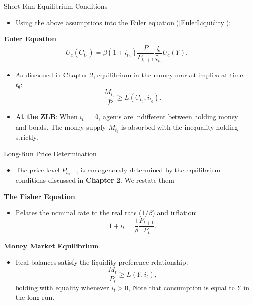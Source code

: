 \documentclass[11pt,aspectratio=169]{beamer}
\begin{document}
\begin{frame}{Short-Run Equilibrium Conditions}
\small

\begin{itemize}
    \item Using the above assumptions into the Euler equation (\ref{EulerLiquidity}):
\end{itemize}
\textbf{Euler Equation}
\begin{equation}
U_{c}(C_{t_{0}})=\beta (1+i_{t_{0}})\frac{\bar{P}}{P_{t_{0}+1}}\frac{\bar{\xi}}{\xi _{t_{0}}}U_{c}(Y). \label{Euler-L}
\end{equation}

\vspace{0.4cm}

\begin{itemize}
    \item As discussed in Chapter 2, equilibrium in the money market implies at time $t_0$:
\begin{equation*}
\frac{M_{t_{0}}}{\bar{P}}\geq L(C_{t_{0}},i_{t_{0}}).
\end{equation*}
    \item \textbf{At the ZLB}: When $i_{t_0} = 0$, agents are indifferent between holding money and bonds. The money supply $M_{t_0}$ is absorbed with the inequality holding strictly.
\end{itemize}

\end{frame}

\begin{frame}{Long-Run Price Determination }
\small
\begin{itemize}
    \item The price level $P_{t_0+1}$ is endogenously determined by the equilibrium conditions discussed in \textbf{Chapter 2}. We restate them:
\end{itemize}

\vspace{0.3cm}
\textbf{The Fisher Equation}
\begin{itemize}
    \item Relates the nominal rate to the real rate ($1/\beta$) and inflation:
    \begin{equation}
    1+i_{t}=\frac{1}{\beta }\frac{P_{t+1}}{P_{t}}  \label{Fisher-L}.
    \end{equation}
\end{itemize}

\vspace{0.2cm}
\textbf{Money Market Equilibrium}
\begin{itemize}
    \item Real balances satisfy the liquidity preference relationship:
    \begin{equation}
    \frac{M_{t}}{P_{t}}\geq L(Y,i_{t}), \label{Money-L}
    \end{equation}
    holding with equality whenever $i_{t}>0$, Note that consumption is equal to $Y$ in the long run.
\end{itemize}
\end{frame}
\end{document}
